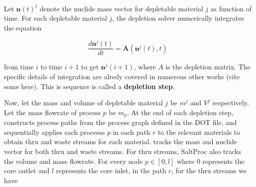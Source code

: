Let $\mathbf{n}(t)^{j}$ denote the nuclide mass vector for depletable material
$j$ as function of time. For each depletable material $j$, the depletion solver numerically
integrates the equation

\begin{equation}
    \frac{d\mathbf{n}^{j}(t)}{dt} = \mathbf{A}(\mathbf{n}^{j}(t), t)
\end{equation}

from time $i$ to time $i+1$ to get $\mathbf{n}^{j}(i+1)$, where $A$ is the
depletion matrix. The specific details of integration are alredy covered in
numerous other works (cite some here). This is sequence is called a {\bf depletion
step}.

Now, let the mass and volume of depletable material $j$ be
$m^{j}$ and $V^{j}$ respectively. Let the mass flowrate of process $p$ be
$\dot{m}_{p}$. At the end of each depletion step, \SaltProc constructs process
paths from the process graph defined in the DOT file, and sequentially applies
each proceess $p$ in each path $r$ to the relevant materials to obtain thru
and waste streams for each material. \SaltProc tracks the mass and nuclide vector for both thru and waste streams. For thru
streams, SaltProc also tracks the volume and mass flowrate. For every node
$p\in[0,l]$ where $0$ represents the core outlet and $l$ represents the core
inlet, in the path $r$, for the thru streams we have

